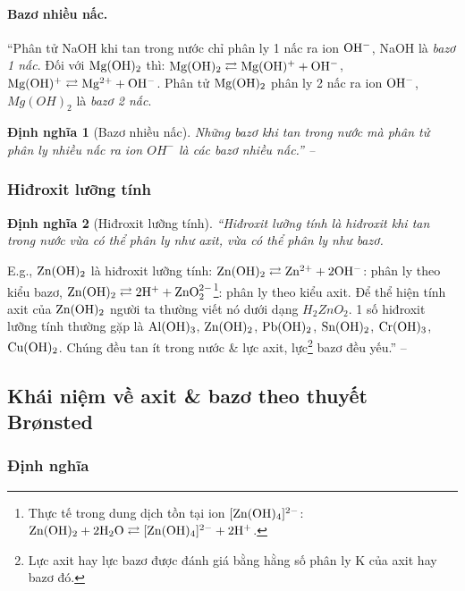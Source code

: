 \documentclass[oneside]{book}
\numberwithin{equation}{section}
\newtheorem{dinhnghia}{Định nghĩa}[section]
\begin{document}
\paragraph{Bazơ nhiều nấc.} ``Phân tử NaOH khi tan trong nước chỉ phân ly 1 nấc ra ion $\rm OH^-$, NaOH là \textit{bazơ 1 nấc}. Đối với $\rm Mg(OH)_2$ thì: $\rm Mg(OH)_2\rightleftarrows Mg(OH)^+ + OH^-$, $\rm Mg(OH)^+\rightleftarrows Mg^{2+} + OH^-$. Phân tử $\rm Mg(OH)_2$ phân ly 2 nấc ra ion $\rm OH^-$, $Mg(OH)_2$ là \textit{bazơ 2 nấc}.

\begin{dinhnghia}[Bazơ nhiều nấc]
	Những bazơ khi tan trong nước mà phân tử phân ly nhiều nấc ra ion $OH^-$ là các \emph{bazơ nhiều nấc}.'' -- \cite[p. 12]{SGK_Hoa_Hoc_11_nang_cao}
\end{dinhnghia}

\subsubsection{Hiđroxit lưỡng tính}

\begin{dinhnghia}[Hiđroxit lưỡng tính]
	``\emph{Hiđroxit lưỡng tính} là hiđroxit khi tan trong nước vừa có thể phân ly như axit, vừa có thể phân ly như bazơ.
\end{dinhnghia}
E.g., $\rm Zn(OH)_2$ là hiđroxit lưỡng tính: $\rm Zn(OH)_2\rightleftarrows Zn^{2+} + 2OH^-$: phân ly theo kiểu bazơ, $\rm Zn(OH)_2\rightleftarrows 2H^+ + ZnO_2^{2-}$\footnote{Thực tế trong dung dịch tồn tại ion $[\rm Zn(OH)_4]^{2-}$: $\rm Zn(OH)_2 + 2H_2O\rightleftarrows[Zn(OH)_4]^{2-} + 2H^+$.}: phân ly theo kiểu axit. Để thể hiện tính axit của $\rm Zn(OH)_2$ người ta thường viết nó dưới dạng $H_2ZnO_2$. 1 số hiđroxit lưỡng tính thường gặp là $\rm Al(OH)_3$, $\rm Zn(OH)_2$, $\rm Pb(OH)_2$, $\rm Sn(OH)_2$, $\rm Cr(OH)_3$, $\rm Cu(OH)_2$. Chúng đều tan ít trong nước \& lực axit, lực\footnote{Lực axit hay lực bazơ được đánh giá bằng hằng số phân ly K của axit hay bazơ đó.} bazơ đều yếu.'' -- \cite[p. 12]{SGK_Hoa_Hoc_11_nang_cao}

\subsection{Khái niệm về axit \& bazơ theo thuyết Br\o nsted}

\subsubsection{Định nghĩa}
\end{document}
